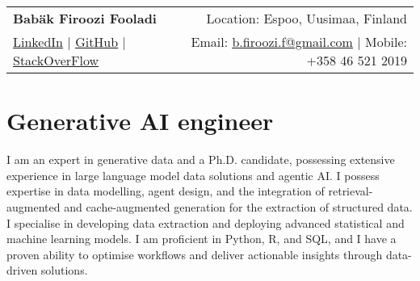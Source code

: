 \documentclass[a4paper,11pt]{article}
\begin{document}
	
	
	
	
	\begin{tabular*}{\textwidth}{l@{\extracolsep{\fill}}r}
		\textbf{\Huge Babäk Firoozi Fooladi \vspace{2pt}} & %
		Location: Espoo, Uusimaa, Finland \\ %
		\href{https://www.linkedin.com/in/babak-firoozi-fooladi/}{\uline{LinkedIn}} $|$ %
		\href{https://github.com/Babakfifoo}{\uline{GitHub}} $|$ %
		\href{https://stackoverflow.com/users/5116559/babak-fi-foo}{\uline{StackOverFlow}} & %
		Email: \href{mailto:b.firoozi.f@gmail.com}{\uline{b.firoozi.f@gmail.com}} $|$ %
		Mobile: +358 46 521 2019 \\ %
	\end{tabular*}
	
	
	
	\section{Generative AI engineer }
	\small{
I am an expert in generative data and a Ph.D. candidate, possessing extensive experience in large language model data solutions and agentic AI. I possess expertise in data modelling, agent design, and the integration of retrieval-augmented and cache-augmented generation for the extraction of structured data. I specialise in developing data extraction and deploying advanced statistical and machine learning models. I am proficient in Python, R, and SQL, and I have a proven ability to optimise workflows and deliver actionable insights through data-driven solutions.
	}
	
	
\end{document}

